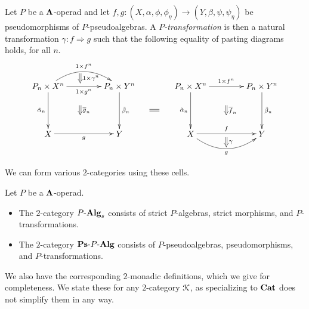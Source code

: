 \begin{Defi}
Let $P$ be a $\mathbf{\Lambda}$-operad and let $f, g \colon (X, \alpha, \phi, \phi_\eta) \rightarrow (Y, \beta, \psi, \psi_\eta)$ be pseudomorphisms of $P$-pseudoalgebras. A \textit{$P$-transformation} is then a natural transformation $\gamma \colon f \Rightarrow g$ such that the following equality of pasting diagrams holds, for all $n$.
    \[
        \xy
            (0,0)*+{P_n \times X^n}="00";
            (30,0)*+{P_n \times Y^n}="10";
            (0,-20)*+{X}="01";
            (30,-20)*+{Y}="11";
            {\ar@/^1.5pc/^{1 \times f^n} "00" ; "10"};
            {\ar_{1 \times g^n} "00" ; "10"};
            {\ar^{\tilde{\beta}_n} "10" ; "11"};
            {\ar_{\tilde{\alpha}_n} "00" ; "01"};
            {\ar_{g} "01" ; "11"};
            {\ar@{=>}^{1 \times \gamma^n} (13.5,5.5) ; (13.5,1.5)};
            {\ar@{=>}^{\overline{g}_n} (13.5,-8) ; (13.5,-12)};
            (60,0)*+{P_n \times X^n}="x00";
            (90,0)*+{P_n \times Y^n}="x10";
            (60,-20)*+{X}="x01";
            (90,-20)*+{Y}="x11";
            {\ar^{1 \times f^n} "x00" ; "x10"};
            {\ar^{\tilde{\beta}_n} "x10" ; "x11"};
            {\ar_{\tilde{\alpha}_n} "x00" ; "x01"};
            {\ar^{f} "x01" ; "x11"};
            {\ar@/_1.5pc/_{g} "x01" ; "x11"};
            {\ar@{=>}^{\gamma} (75,-21.5) ; (75,-25.5)};
            {\ar@{=>}^{\overline{f}_n} (75,-8) ; (75,-12)};
            {\ar@{=} (42.75,-10) ; (46.75,-10)};
        \endxy
    \]
\end{Defi}

We can form various $2$-categories using these cells.

\begin{Defi}
Let $P$ be a $\mathbf{\Lambda}$-operad.
\begin{itemize}
\item The $2$-category $P\mbox{-}\mathbf{Alg}_{s}$ consists of strict $P$-algebras, strict morphisms, and $P$-transformations.
\item The $2$-category $\mathbf{Ps}\mbox{-}P\mbox{-}\mathbf{Alg}$ consists of $P$-pseudoalgebras, pseudomorphisms, and $P$-transformations.
\end{itemize}
\end{Defi}

We also have the corresponding $2$-monadic definitions, which we give for completeness. We state these for any $2$-category $\mathcal{K}$, as specializing to $\mathbf{Cat}$ does not simplify them in any way.

